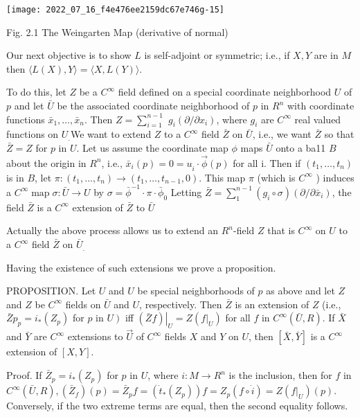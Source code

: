 \documentclass[10pt]{article}
\begin{document}
\texttt{[image: 2022\_07\_16\_f4e476ee2159dc67e746g-15]}

Fig. 2.1 The Weingarten Map (derivative of normal)

Our next objective is to show $L$ is self-adjoint or symmetric; i.e., if $X, Y$ are in $M$ then $\langle L(X), Y\rangle=\langle X, L(Y)\rangle$.

To do this, let $Z$ be a $C^{\infty}$ field defined on a special coordinate neighborhood $U$ of $p$ and let $\bar{U}$ be the associated coordinate neighborhood of $p$ in $R^{n}$ with coordinate functions $\bar{x}_{1}, \ldots, \bar{x}_{n}$. Then $Z=\sum_{i=1}^{n-1}$ $g_{i}\left(\partial / \partial x_{i}\right)$, where $g_{i}$ are $C^{\infty}$ real valued functions on $U_{.}$We want to extend $Z$ to a $C^{\infty}$ field $\bar{Z}$ on $\bar{U}$, i.e., we want $\bar{Z}$ so that $\bar{Z}=Z$ for $p$ in $U$. Let us assume the coordinate map $\phi$ maps $\bar{U}$ onto a ba11 $B$ about the origin in $R^{n}$, i.e., $\bar{x}_{i}(p)=0=u_{\dot{i}} \cdot \vec{\phi}(p)$ for all i. Then if $\left(t_{1}, \ldots, t_{n}\right)$ is in $B$, let $\pi:\left(t_{1}, \ldots, t_{n}\right) \rightarrow\left(t_{1}, \ldots, t_{n-1}, 0\right)$. This map $\pi$ (which is $C^{\infty}$ ) induces a $C^{\infty} \operatorname{map} \sigma: \bar{U} \rightarrow U$ by $\sigma=\bar{\phi}^{-1} \cdot \pi \cdot \bar{\phi}_{0}$ Letting $\bar{Z}=\sum_{1}^{n-1}\left(g_{i} \circ \sigma\right)\left(\partial / \partial \bar{x}_{i}\right)$, the field $\bar{Z}$ is a $C^{\infty}$ extension of $\bar{Z}$ to $\bar{U}$

Actually the above process allows us to extend an $R^{n}$-field $Z$ that is $C^{\infty}$ on $U$ to a $C^{\infty}$ field $\bar{Z}$ on $\bar{U}_{.}$

Having the existence of such extensions we prove a proposition.

PROPOSITION. Let $U$ and $U$ be special neighborhoods of $p$ as above and let $Z$ and $Z$ be $C^{\infty}$ fields on $\bar{U}$ and $U$, respectively. Then $\bar{Z}$ is an extension of $Z$ (i.e., $\bar{Z} p_{p}=i_{*}\left(Z_{p}\right)$ for $p$ in $\left.U\right)$ iff $\left.(\bar{Z} f)\right|_{U}=Z\left(\left.f\right|_{U}\right)$ for all $f$ in $C^{\infty}(\bar{U}, R)$. If $\bar{X}$ and $\bar{Y}$ are $C^{\infty}$ extensions to $\vec{U}$ of $C^{\infty}$ fields $X$ and $Y$ on $U$, then $[\bar{X}, \bar{Y}]$ is a $C^{\infty}$ extension of $[X, Y] .$

Proof. If $\bar{Z}_{p}=i_{*}\left(Z_{p}\right)$ for $p$ in $U$, where $i: M \rightarrow R^{n}$ is the inclusion, then for $f$ in $C^{\infty}(\bar{U}, R),\left(\bar{Z}_{f}\right)(p)=\bar{Z}_{p} f=\left(\dot{t}_{*}\left(Z_{p}\right)\right) f=Z_{p}(f \circ \dot{i})=Z\left(\left.f\right|_{U}\right)(p)$. Conversely, if the two extreme terms are equal, then the second equality follows.
\end{document}
